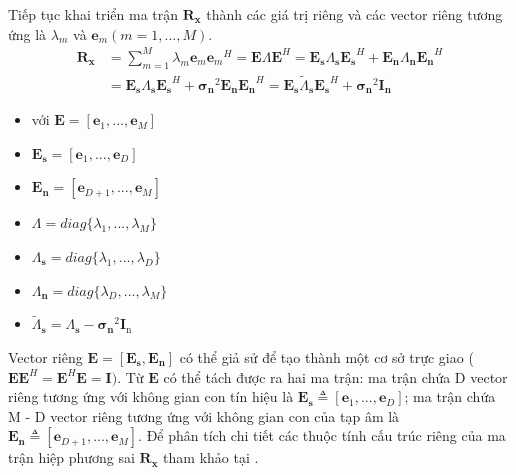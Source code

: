 Tiếp tục khai triển ma trận $\mathbf{R}_{\mathbf{x}}$ thành các giá trị riêng và các vector riêng tương ứng là $\lambda_{m}$ và $\mathbf{e}_{m} (m =1, ..., M)$.
\begin{equation}
\begin{split}
	\mathbf{R}_{\mathbf{x}} &= \sum_{m = 1}^{M} \lambda_{m}\mathbf{e}_{m}{\mathbf{e}_{m}}^{H} = \mathbf{E}\Lambda\mathbf{E}^{H} = \mathbf{E}_{\mathbf{s}}\Lambda_{\mathbf{s}}{\mathbf{E}_{\mathbf{s}}}^{H} + \mathbf{E}_{\mathbf{n}}\Lambda_{\mathbf{n}}{\mathbf{E}_{\mathbf{n}}}^{H} \\
	  &=\mathbf{E}_{\mathbf{s}}\Lambda_{\mathbf{s}}{\mathbf{E}_{\mathbf{s}}}^{H} +  {\mathbf{\sigma}_{\mathbf{n}}}^{2}\mathbf{E}_{\mathbf{n}}{\mathbf{E}_{\mathbf{n}}}^{H} = \mathbf{E}_{\mathbf{s}}\tilde{\Lambda}_{\mathbf{s}}{\mathbf{E}_{\mathbf{s}}}^{H} + {\mathbf{\sigma}_{\mathbf{n}}}^{2}\mathbf{I}_{\mathbf{n}}
\end{split}
\end{equation}
{\renewcommand\labelitemi{}
\begin{itemize}
  \item với $\mathbf{E} = [\mathbf{e}_{1}, ..., \mathbf{e}_{M}]$
  \item \hspace{0.7cm}$\mathbf{E}_{\mathbf{s}} = [\mathbf{e}_{1}, ..., \mathbf{e}_{D}]$
  \item \hspace{0.7cm}$\mathbf{E}_{\mathbf{n}} = [\mathbf{e}_{D+1}, ..., \mathbf{e}_{M}]$ 
  \item \hspace{0.7cm}$\Lambda = diag\{\lambda_{1}, ..., \lambda_{M}\}$
  \item \hspace{0.7cm}$\Lambda_{\mathbf{s}} = diag\{\lambda_{1}, ..., \lambda_{D}\}$
  \item \hspace{0.7cm}$\Lambda_{\mathbf{n}} = diag\{\lambda_{D}, ..., \lambda_{M}\}$
  \item \hspace{0.7cm}$\tilde{\Lambda}_{\mathbf{s}} = \Lambda_{\mathbf{s}} - {\mathbf{\sigma}_{\mathbf{n}}}^{2}\mathbf{I}_{\mathrm{n}}$
\end{itemize}
}
 
Vector riêng $\mathbf{E} = [\mathbf{E}_{\mathbf{s}}, \mathbf{E}_{\mathbf{n}}]$ có thể giả sử để tạo thành một cơ sở trực giao ($\mathbf{E}\mathbf{E}^{H} = \mathbf{E}^{H}\mathbf{E} = \mathbf{I})$. Từ $\mathbf{E}$ có thể tách được ra hai ma trận: ma trận chứa D vector riêng tương ứng với không gian con tín hiệu là $\mathbf{E}_{\mathbf{s}} \triangleq [\mathbf{e}_{1}, ..., \mathbf{e}_{D}]$; ma trận chứa M - D vector riêng tương ứng với không gian con của tạp âm là $\mathbf{E}_{\mathbf{n}} \triangleq [\mathbf{e}_{D+1}, ..., \mathbf{e}_{M}]$. Để phân tích chi tiết các thuộc tính cấu trúc riêng của ma trận hiệp phương sai $\mathbf{R}_{\mathbf{x}}$ tham khảo tại \cite{Schmidt2009a}.


